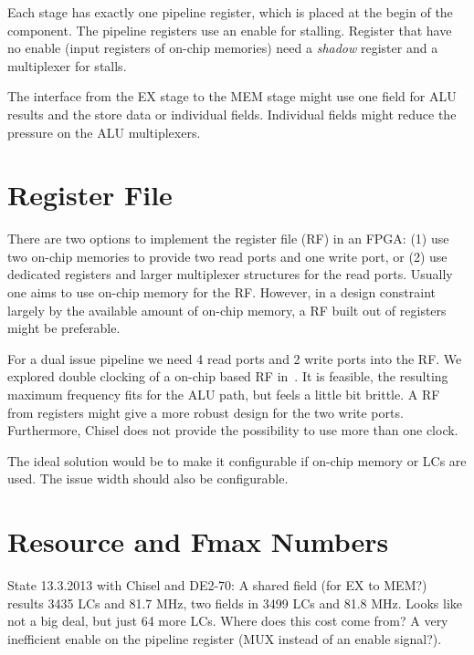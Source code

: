 \documentclass[a4paper,fontsize=10pt,twoside,DIV15,BCOR12mm,headinclude=true,footinclude=false,pagesize,bibtotoc]{scrbook}
\newcommand{\comment}[3]{

\textsf{\textbf{#1}} {\color{#3}#2}}
\newcommand{\martin}[1]{\comment{Martin}{#1}{Blue}}
\renewcommand{\martin}[1]{}
\begin{document}
Each stage has exactly one pipeline register, which is placed at the begin
of the component. The pipeline registers use an enable for stalling.
Register that have no enable (input registers of on-chip memories) need
a \emph{shadow} register and a multiplexer for stalls.

The interface from the EX stage to the MEM stage might use one
field for ALU results and the store data or individual fields. Individual
fields might reduce the pressure on the ALU multiplexers.
\martin{Update to the current implementation -- check for difference.}


\section{Register File}

There are two options to implement the register file (RF) in an FPGA: (1) use
two on-chip memories to provide two read ports and one write port, or (2)
use dedicated registers and larger multiplexer structures for the read
ports. Usually one aims to use on-chip memory for the RF. However,
in a design constraint largely by the available amount of on-chip memory,
a RF built out of registers might be preferable.

For a dual issue pipeline we need 4 read ports and 2 write ports into the RF.
We explored double clocking of a on-chip based RF in~\cite{patmos:ppes2011}.
It is feasible, the resulting maximum frequency fits for the ALU path, but feels
a little bit brittle. A RF from registers might give a more robust design for the
two write ports. Furthermore, Chisel does not provide the possibility to use
more than one clock.

The ideal solution would be to make it configurable if on-chip memory or
LCs are used. The issue width should also be configurable.




\section{Resource and Fmax Numbers}

State 13.3.2013 with Chisel and DE2-70: A shared field (for EX to MEM?) results 3435 LCs
and 81.7 MHz, two fields in 3499 LCs and 81.8 MHz. Looks like not a big deal,
but just 64 more LCs. Where does this cost come from? A very inefficient
enable on the pipeline register (MUX instead of an enable signal?).

\martin{Update with reduced ALU muxes and also with additional second
ALU pipeline (forwarding). Is dual issue configurable?}
\end{document}
